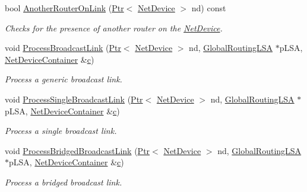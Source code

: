 \begin{DoxyCompactItemize}
bool \hyperlink{classns3_1_1GlobalRouter_ae2af74f394b3b8de4daad7000fb0b9f7}{Another\+Router\+On\+Link} (\hyperlink{classns3_1_1Ptr}{Ptr}$<$ \hyperlink{classns3_1_1NetDevice}{Net\+Device} $>$ nd) const 
\begin{DoxyCompactList}\small\item\em Checks for the presence of another router on the \hyperlink{classns3_1_1NetDevice}{Net\+Device}. \end{DoxyCompactList}\item 
void \hyperlink{classns3_1_1GlobalRouter_af981be58153ef32690b434072cd3205b}{Process\+Broadcast\+Link} (\hyperlink{classns3_1_1Ptr}{Ptr}$<$ \hyperlink{classns3_1_1NetDevice}{Net\+Device} $>$ nd, \hyperlink{classns3_1_1GlobalRoutingLSA}{Global\+Routing\+L\+SA} $\ast$p\+L\+SA, \hyperlink{classns3_1_1NetDeviceContainer}{Net\+Device\+Container} \&\hyperlink{mmwave_2model_2fading-traces_2fading__trace__generator_8m_ae0323a9039add2978bf5b49550572c7c}{c})
\begin{DoxyCompactList}\small\item\em Process a generic broadcast link. \end{DoxyCompactList}\item 
void \hyperlink{classns3_1_1GlobalRouter_a16b0eecb167b84a7160c8903839a826f}{Process\+Single\+Broadcast\+Link} (\hyperlink{classns3_1_1Ptr}{Ptr}$<$ \hyperlink{classns3_1_1NetDevice}{Net\+Device} $>$ nd, \hyperlink{classns3_1_1GlobalRoutingLSA}{Global\+Routing\+L\+SA} $\ast$p\+L\+SA, \hyperlink{classns3_1_1NetDeviceContainer}{Net\+Device\+Container} \&\hyperlink{mmwave_2model_2fading-traces_2fading__trace__generator_8m_ae0323a9039add2978bf5b49550572c7c}{c})
\begin{DoxyCompactList}\small\item\em Process a single broadcast link. \end{DoxyCompactList}\item 
void \hyperlink{classns3_1_1GlobalRouter_a7368716600989ea7d4bec67fa4f86e4c}{Process\+Bridged\+Broadcast\+Link} (\hyperlink{classns3_1_1Ptr}{Ptr}$<$ \hyperlink{classns3_1_1NetDevice}{Net\+Device} $>$ nd, \hyperlink{classns3_1_1GlobalRoutingLSA}{Global\+Routing\+L\+SA} $\ast$p\+L\+SA, \hyperlink{classns3_1_1NetDeviceContainer}{Net\+Device\+Container} \&\hyperlink{mmwave_2model_2fading-traces_2fading__trace__generator_8m_ae0323a9039add2978bf5b49550572c7c}{c})
\begin{DoxyCompactList}\small\item\em Process a bridged broadcast link. \end{DoxyCompactList}\item 

\end{DoxyCompactItemize}
